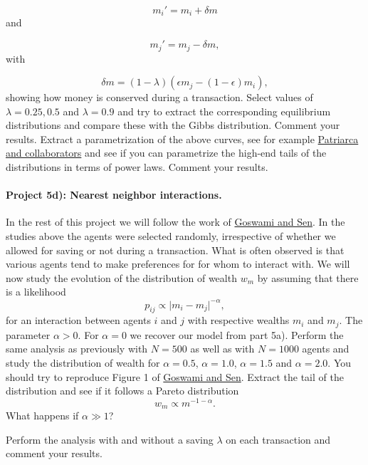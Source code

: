 \documentclass[%
oneside,                 %
final,                   %
10pt]{article}
\begin{document}
\begin{equation*}
  m_i'=m_i+\delta m
  \end{equation*}
  and

\begin{equation*}
  m_j'=m_j-\delta m,
  \end{equation*}
  with

\begin{equation*}
  \delta m=(1-\lambda)(\epsilon m_j-(1-\epsilon)m_i),
  \end{equation*}
  showing how money is conserved during a transaction.
  Select values of $\lambda =0.25,0.5$ and $\lambda=0.9$ and try to extract the corresponding
  equilibrium distributions and compare these with the Gibbs distribution. Comment your results.
Extract a parametrization of the above curves, see for example \href{{http://www.sciencedirect.com/science/article/pii/S0378437104004327}}{Patriarca and collaborators} and see if you can parametrize the high-end tails of the distributions in terms of power laws. Comment your results.

\paragraph{Project 5d): Nearest neighbor interactions.}
In the rest of this project we will follow the work of \href{{http://www.sciencedirect.com/science/article/pii/S0378437114006967}}{Goswami and Sen}. 
In the studies above the agents were selected randomly, irrespective of whether we allowed for
saving or not during a transaction. What is often observed is that various agents tend to make preferences for for whom to interact with. We will now study the evolution of the distribution of wealth $w_m$ by assuming that there is a likelihood 
\[
p_{ij} \propto \vert m_i-m_j\vert^{-\alpha},
\]
for an interaction between agents $i$ and $j$ with respective wealths $m_i$ and $m_j$. The parameter  $\alpha >  0$. For $\alpha=0$ we recover our model from part 5a). 
Perform the same analysis as previously with $N=500$ as well as with $N=1000$ agents and study the distribution of wealth for $\alpha =0.5$, $\alpha =1.0$, $\alpha =1.5$ and $\alpha =2.0$. 
You should try to reproduce Figure 1 of \href{{http://www.sciencedirect.com/science/article/pii/S0378437114006967}}{Goswami and Sen}. 
Extract the tail of the distribution and see if it follows a Pareto distribution
\[
w_m\propto m^{-1-\alpha}. 
\]
What happens if $\alpha \gg 1$?

Perform the analysis with and without a saving $\lambda$ on each transaction and comment your results. 
\end{document}
